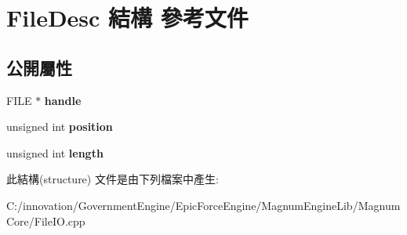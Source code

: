 \hypertarget{struct_file_desc}{}\section{File\+Desc 結構 參考文件}
\label{struct_file_desc}
\subsection*{公開屬性}
\begin{DoxyCompactItemize}
\item 
F\+I\+LE $\ast$ {\bfseries handle}\hypertarget{struct_file_desc_a95fee0607e601dec7896240392b31003}{}\label{struct_file_desc_a95fee0607e601dec7896240392b31003}

\item 
unsigned int {\bfseries position}\hypertarget{struct_file_desc_a96cb711cd8d450bc7592745a0b6b9113}{}\label{struct_file_desc_a96cb711cd8d450bc7592745a0b6b9113}

\item 
unsigned int {\bfseries length}\hypertarget{struct_file_desc_ab21834661d53d0ec4819e2a337410efc}{}\label{struct_file_desc_ab21834661d53d0ec4819e2a337410efc}

\end{DoxyCompactItemize}


此結構(structure) 文件是由下列檔案中產生\+:\begin{DoxyCompactItemize}
\item 
C\+:/innovation/\+Government\+Engine/\+Epic\+Force\+Engine/\+Magnum\+Engine\+Lib/\+Magnum\+Core/File\+I\+O.\+cpp\end{DoxyCompactItemize}
